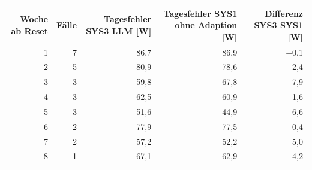 \begin{tabular}{rrrrr}
\toprule
Woche ab Reset & Fälle & Tagesfehler SYS3 LLM [W] & Tagesfehler SYS1 ohne Adaption [W] & Differenz SYS3 \textminus{} SYS1 [W] \\
\midrule
1 & 7 & 86,7 & 86,9 & $-$0,1 \\
2 & 5 & 80,9 & 78,6 & 2,4 \\
3 & 3 & 59,8 & 67,8 & $-$7,9 \\
4 & 3 & 62,5 & 60,9 & 1,6 \\
5 & 3 & 51,6 & 44,9 & 6,6 \\
6 & 2 & 77,9 & 77,5 & 0,4 \\
7 & 2 & 57,2 & 52,2 & 5,0 \\
8 & 1 & 67,1 & 62,9 & 4,2 \\
\bottomrule
\end{tabular}
